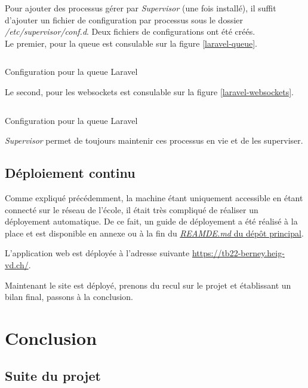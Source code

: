 \documentclass[
    iai, %
    il, %
]{heig-tb}
\begin{document}
Pour ajouter des processus gérer par \emph{Supervisor} (une fois installé), il suffit d'ajouter un fichier de configuration par processus sous le dossier \emph{/etc/supervisor/conf.d}. Deux fichiers de configurations ont été créés. \\
Le premier, pour la queue est consulable sur la figure \ref{laravel-queue}.

\begin{listing}[h]
    \inputminted{configuration}{assets/code/laravel-queue.conf}
    \caption{Configuration pour la queue Laravel \label{laravel-queue}}
\end{listing}

Le second, pour les \Gls{websockets} est consulable sur la figure \ref{laravel-websockets}.

\begin{listing}[h]
    \inputminted{configuration}{assets/code/laravel-websockets.conf}
    \caption{Configuration pour la queue Laravel \label{laravel-websockets}}
\end{listing}

\emph{Supervisor} permet de toujours maintenir ces processus en vie et de les superviser.

\section{Déploiement continu}
Comme expliqué précédemment, la machine étant uniquement accessible en étant connecté sur le réseau de l'école, il était très compliqué de réaliser un déployement automatique.
De ce fait, un guide de déployement a été réalisé à la place et est disponible en annexe ou à la fin du \href{https://github.com/heig-fablab/fablab-manager/blob/main/README.md}{\emph{REAMDE.md} du dépôt principal}.

L'application web est déployée à l'adresse suivante \href{https://tb22-berney.heig-vd.ch/}{https://tb22-berney.heig-vd.ch/}.

Maintenant le site est déployé, prenons du recul sur le projet et établissant un bilan final, passons à la conclusion.

\chapter{Conclusion}

\section{Suite du projet}
\end{document}

